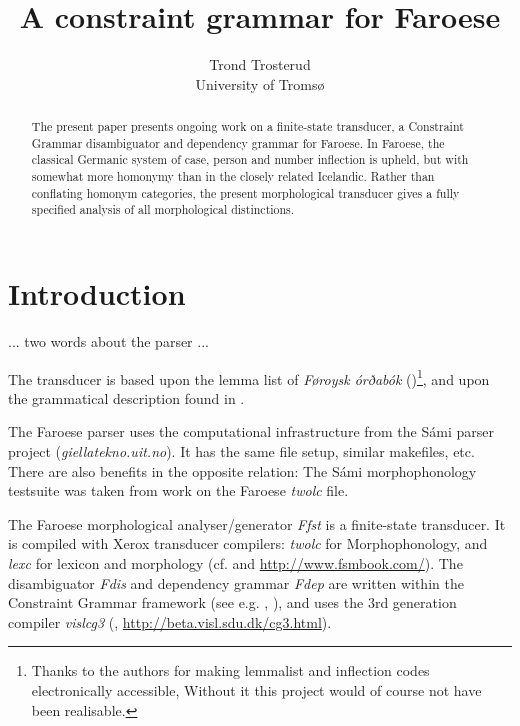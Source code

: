 \documentclass[11pt]{article}
\begin{document}
\title{A constraint grammar for Faroese}
\author{Trond Trosterud \\ 
University of Tromsø}

\date{}

\maketitle{}

\begin{abstract}
The present paper presents ongoing work on a finite-state transducer, a Constraint Grammar disambiguator and dependency grammar for Faroese. In Faroese, the classical Germanic system of case, person and number inflection is upheld, but with somewhat more homonymy than in the closely related Icelandic. Rather than conflating homonym categories, the present morphological transducer gives a fully specified analysis of all morphological distinctions.
\end{abstract}

\section{Introduction} 

... two words about the parser ...

The transducer is based upon the lemma list of \emph{Føroysk órðabók} (\cite{Poulsen98})\footnote{Thanks to the authors for making lemmalist and inflection codes electronically accessible, Without it this project would of course not have been realisable.}, and upon the grammatical description found in \cite{Thr04}. 

The Faroese parser uses the computational infrastructure from the Sámi parser project (\textit{giellatekno.uit.no}). It has the same file setup, similar makefiles, etc. There are also benefits in the opposite relation: The Sámi morphophonology testsuite was taken from work on the Faroese \textit{twolc} file. 

The Faroese morphological analyser/generator \textit{Ffst} is a finite-state transducer. It is compiled with Xerox transducer compilers: \textit{twolc} for Morphophonology, and \textit{lexc} for lexicon and morphology (cf. \cite{Beesley03} and \url{http://www.fsmbook.com/}). The disambiguator \textit{Fdis} and dependency grammar \textit{Fdep} are written within the Constraint Grammar framework (see e.g. \cite{Karlsson90}, \cite{Karlsson95}), and uses the 3rd generation compiler \textit{vislcg3} (\cite{Bick00}, \url{http://beta.visl.sdu.dk/cg3.html}).
\end{document}
